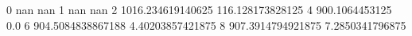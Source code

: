 0 nan nan
1 nan nan
2 1016.234619140625 116.128173828125
4 900.1064453125 0.0
6 904.5084838867188 4.40203857421875
8 907.3914794921875 7.2850341796875
